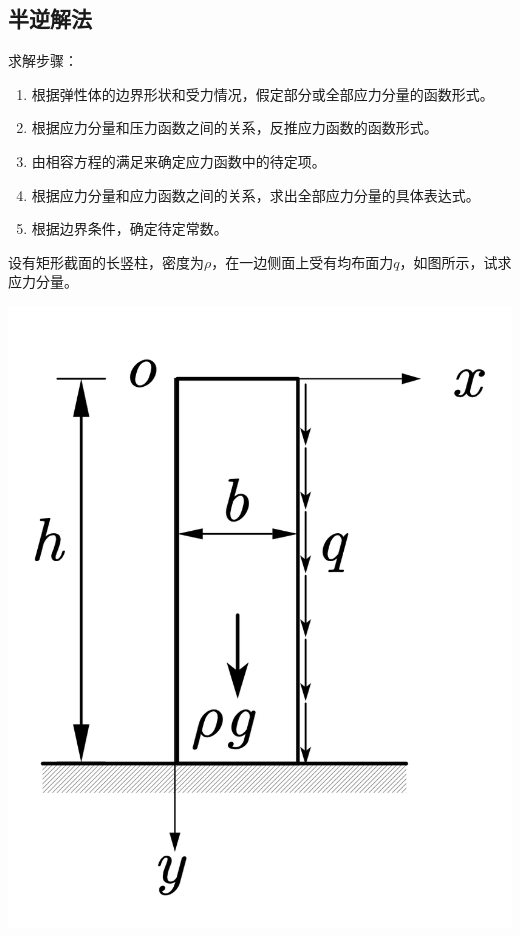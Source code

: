 \subsection{半逆解法}
求解步骤：
\begin{enumerate}
	\item 根据弹性体的边界形状和受力情况，假定部分或全部应力分量的函数形式。
	\item 根据应力分量和压力函数之间的关系，反推应力函数的函数形式。
	\item 由相容方程的满足来确定应力函数中的待定项。
	\item 根据应力分量和应力函数之间的关系，求出全部应力分量的具体表达式。
	\item 根据边界条件，确定待定常数。
\end{enumerate}
\begin{example}
	设有矩形截面的长竖柱，密度为$\rho$，在一边侧面上受有均布面力$q$，如图所示，试求应力分量。
\end{example}
\centerline{\includegraphics[scale=0.7]{figure/3-5.png}}
